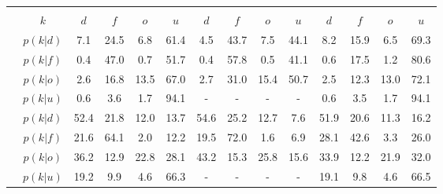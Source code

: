 \begin{figure}[H]
\begin{tabular}{c|c|cccc|cccc|cccc}
		\multicolumn{13}{c}{}\\
		&$k$ & $d$ & $f$ & $o$ & $u$ & $d$ & $f$ & $o$ & $u$ & $d$ & $f$ & $o$ & $u$\\
		\hline
		\parbox[t]{2mm}{}&$p(k|d)$ & \textcolor{mygreen}{7.1} & \textcolor{myred}{24.5} & \textcolor{myred}{6.8} & 61.4 & \textcolor{mygreen}{4.5} & \textcolor{myred}{43.7} & \textcolor{myred}{7.5} & 44.1 & \textcolor{mygreen}{8.2} & \textcolor{myred}{15.9} & \textcolor{myred}{6.5} & 69.3\\
		&$p(k|f)$ & \textcolor{myred}{0.4} & \textcolor{mygreen}{47.0} & \textcolor{myred}{0.7} & 51.7 & \textcolor{myred}{0.4} & \textcolor{mygreen}{57.8} & \textcolor{myred}{0.5} & 41.1 & \textcolor{myred}{0.6} & \textcolor{mygreen}{17.5} & \textcolor{myred}{1.2} & 80.6\\
		&$p(k|o)$ & \textcolor{myred}{2.6} & \textcolor{myred}{16.8} & \textcolor{mygreen}{13.5} & 67.0 & \textcolor{myred}{2.7} & \textcolor{myred}{31.0} & \textcolor{mygreen}{15.4} & 50.7 & \textcolor{myred}{2.5} & \textcolor{myred}{12.3} & \textcolor{mygreen}{13.0} & 72.1\\
		&$p(k|u)$ & 0.6 & 3.6 & 1.7 & 94.1 & - & - & - & - & 0.6 & 3.5 & 1.7 & 94.1\\
		\hline
		\parbox[t]{2mm}{}&$p(k|d)$ & \textcolor{mygreen}{52.4} & \textcolor{myred}{21.8} & \textcolor{myred}{12.0} & 13.7 & \textcolor{mygreen}{54.6} & \textcolor{myred}{25.2} & \textcolor{myred}{12.7} & 7.6 & \textcolor{mygreen}{51.9} & \textcolor{myred}{20.6} & \textcolor{myred}{11.3} & 16.2\\
		&$p(k|f)$ & \textcolor{myred}{21.6} & \textcolor{mygreen}{64.1} & \textcolor{myred}{2.0} & 12.2 & \textcolor{myred}{19.5} & \textcolor{mygreen}{72.0} & \textcolor{myred}{1.6} & 6.9 & \textcolor{myred}{28.1} & \textcolor{mygreen}{42.6} & \textcolor{myred}{3.3} & 26.0\\
		&$p(k|o)$ & \textcolor{myred}{36.2} & \textcolor{myred}{12.9} & \textcolor{mygreen}{22.8} & 28.1 & \textcolor{myred}{43.2} & \textcolor{myred}{15.3} & \textcolor{mygreen}{25.8} & 15.6 & \textcolor{myred}{33.9} & \textcolor{myred}{12.2} & \textcolor{mygreen}{21.9} & 32.0\\
		&$p(k|u)$ & 19.2 & 9.9 & 4.6 & 66.3 & - & - & - & - & 19.1 & 9.8 & 4.6 & 66.5\\
		\hline

\end{tabular}
\end{figure}
